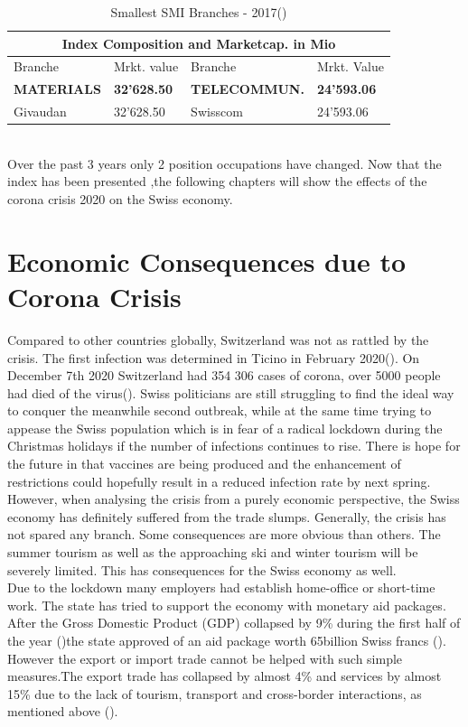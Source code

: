 \documentclass[11pt,a4paper]{article}
\begin{document}
\begin{table}[h]
\centering
\caption{Smallest SMI Branches - 2017(\cite{DieBoerse})}
\setlength{\arrayrulewidth}{0.5mm}
\setlength{\tabcolsep}{5pt}
\renewcommand{\arraystretch}{2}
{
\begin{tabular}[c]{ |p{3cm}|p{3cm}|p{3cm}|p{3cm}| }
\hline
\multicolumn{4}{|c|}{Index Composition and Marketcap. in Mio} \\
\hline
Branche & Mrkt. value & Branche & Mrkt. Value\\
\hline
\textbf{MATERIALS} & \textbf{32’628.50} &\textbf{TELECOMMUN.} & \textbf{24’593.06} \\
Givaudan & 32’628.50 & Swisscom & 24’593.06 \\
\hline
\end{tabular}
}
\end{table}
\\ 
\noindent Over the past 3 years only 2 position occupations have changed. Now that the index has been presented ,the following chapters will show the effects of the corona crisis 2020 on the Swiss economy.\\ 
\newpage

\section{Economic Consequences due to Corona Crisis}

Compared to other countries globally, Switzerland was not as rattled by the crisis. The first infection was determined in Ticino in February 2020(\cite{BundesamtFürGesundheit}). 
On December 7th 2020 Switzerland had 354 306 cases of corona, over 5000 people had died of the virus(\cite{Worldometer(2020)}).
Swiss politicians are still struggling to find the ideal way to conquer the meanwhile second outbreak, while at the same time trying to appease the Swiss population which is in fear of a radical lockdown during the Christmas holidays if the number of infections continues to rise. There is hope for the future in that vaccines are being produced and the enhancement of restrictions could hopefully result in a reduced infection rate by next spring. However, when analysing the crisis from a purely economic perspective, the Swiss economy has definitely suffered from the trade slumps. Generally, the crisis has not spared any branch. Some consequences are more obvious than others. The summer tourism as well as the approaching ski and winter tourism will be severely limited. This has consequences for the Swiss economy as well. \\
Due to the lockdown many employers had establish home-office or short-time work. The state has tried to support the economy with monetary aid packages. After the Gross Domestic Product (GDP) collapsed by 9\% during the first half of the year (\cite{HandelszeitungUndBilanz})the state approved of an aid package worth 65billion Swiss francs (\cite{PaulineTuruban(2020)}). However the export or import trade cannot be helped with such simple measures.The export trade has collapsed by almost 4\% and services by almost 15\% due to the lack of tourism, transport and cross-border interactions, as mentioned above (\cite{HandelszeitungUndBilanz}).
\end{document}
